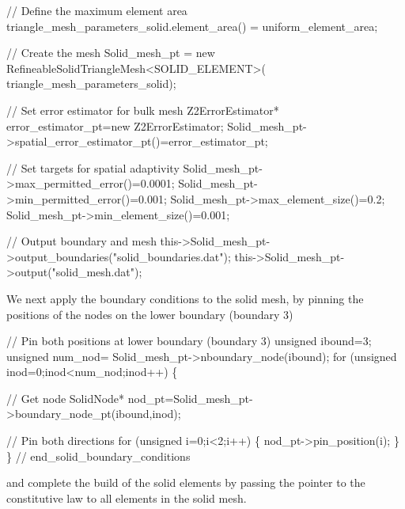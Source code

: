 \begin{DoxyCodeInclude}
 \textcolor{comment}{// Define the maximum element area}
 triangle\_mesh\_parameters\_solid.element\_area() =
   uniform\_element\_area;

 \textcolor{comment}{// Create the mesh}
 Solid\_mesh\_pt =
   \textcolor{keyword}{new} RefineableSolidTriangleMesh<SOLID\_ELEMENT>(
     triangle\_mesh\_parameters\_solid);

 \textcolor{comment}{// Set error estimator for bulk mesh}
 Z2ErrorEstimator* error\_estimator\_pt=\textcolor{keyword}{new} Z2ErrorEstimator;
 Solid\_mesh\_pt->spatial\_error\_estimator\_pt()=error\_estimator\_pt;

 \textcolor{comment}{// Set targets for spatial adaptivity}
 Solid\_mesh\_pt->max\_permitted\_error()=0.0001;
 Solid\_mesh\_pt->min\_permitted\_error()=0.001; 
 Solid\_mesh\_pt->max\_element\_size()=0.2;
 Solid\_mesh\_pt->min\_element\_size()=0.001; 
   
 \textcolor{comment}{// Output boundary and mesh}
 this->Solid\_mesh\_pt->output\_boundaries(\textcolor{stringliteral}{"solid\_boundaries.dat"});
 this->Solid\_mesh\_pt->output(\textcolor{stringliteral}{"solid\_mesh.dat"});

\end{DoxyCodeInclude}


We next apply the boundary conditions to the solid mesh, by pinning the positions of the nodes on the lower boundary (boundary 3)


\begin{DoxyCodeInclude}
 
 \textcolor{comment}{// Pin both positions at lower boundary (boundary 3)}
 \textcolor{keywordtype}{unsigned} ibound=3;
 \textcolor{keywordtype}{unsigned} num\_nod= Solid\_mesh\_pt->nboundary\_node(ibound);
 \textcolor{keywordflow}{for} (\textcolor{keywordtype}{unsigned} inod=0;inod<num\_nod;inod++)
  \{  

   \textcolor{comment}{// Get node}
   SolidNode* nod\_pt=Solid\_mesh\_pt->boundary\_node\_pt(ibound,inod);
   
   \textcolor{comment}{// Pin both directions}
   \textcolor{keywordflow}{for} (\textcolor{keywordtype}{unsigned} i=0;i<2;i++)
    \{
     nod\_pt->pin\_position(i);
    \}
  \} \textcolor{comment}{// end\_solid\_boundary\_conditions}

\end{DoxyCodeInclude}


and complete the build of the solid elements by passing the pointer to the constitutive law to all elements in the solid mesh.


